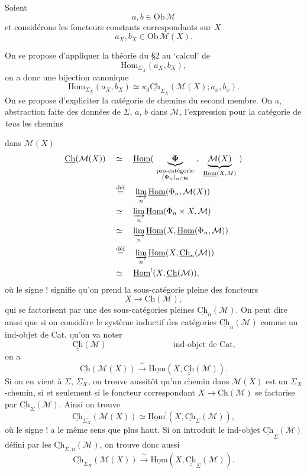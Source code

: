 \documentclass[11pt]{article}
\newcommand{\printedpage}[1]{\marginpar{\footnotesize p.~#1}}
\newcommand{\msp}[1]{\marginpar{\footnotesize [#1]}}
\newcommand{\uHom}{\underline{\mathrm{Hom}}}
\newcommand{\Hom}{\mathrm{Hom}}
\newcommand{\uCh}{\underline{\mathrm{Ch}}}
\newcommand{\Ch}{\underline{\mathrm{Ch}}}
\newcommand{\cM}{\mathcal{M}}
\newcommand{\Chh}{\underline{\underline{\mathrm{Ch}}}}
\newcommand{\dfeq}{\overset{\text{déf}}{=}}
\begin{document}
Soient
\[
a, b \in \mathrm{Ob}\,\mathcal{M}
\]
et considérons les foncteurs constants correspondants sur $X$
\[
a_X, b_X \in \mathrm{Ob}\,\mathcal{M}(X).
\]

\msp{page 29}On se propose d'appliquer la théorie du \S2 au `calcul' de
\[
\Hom_{\Sigma_X}(a_X, b_X),
\]
on a donc une bijection canonique
\[
\boxed{\Hom_{\Sigma_X}(a_X, b_X) \simeq \pi_0\uCh_{\Sigma_X}(\mathcal{M}(X); a_x, b_x).} %
\]
On se propose d'expliciter la catégorie de chemins du second membre. On a, abstraction faite des données de $\Sigma$, $a$, $b$ dans $\mathcal{M}$, l'expression pour la catégorie de \textit{tous} les chemins

\printedpage{19}

dans $\cM(X)$
\[
\begin{aligned}
\Ch(\cM(X)) \quad &\simeq \quad \uHom(\ \underbrace{\boldsymbol{\Phi}}_{\substack{\text{pro-catégorie}\\ (\Phi_n)_{n\in\mathbf{N}}}}\ ,\ \underbrace{\cM(X)}_{\uHom(X,M)}\ ) \\ %
&\dfeq \quad \varinjlim_n \uHom(\Phi_n,\cM(X)) \\
&\simeq \quad \varinjlim_n \uHom(\Phi_n\times X,\cM) \\
&\simeq \quad \varinjlim_n \uHom(X,\uHom(\Phi_n,\cM)) \\
&\dfeq \quad \varinjlim_n \uHom(X,\Ch_n(\cM)) \\
&\simeq \quad \uHom^{!}(X,\Ch(\cM)),
\end{aligned}
\]
où le signe ! signifie qu'on prend la sous-catégorie pleine des foncteurs
\[
X\longrightarrow \Ch(\cM),
\]
\msp{page 30}
qui se factorisent par une des sous-catégories pleines $\Ch_n(\cM)$. On peut dire aussi que si on considère le système inductif des catégories $\Ch_n(\cM)$ comme un ind-objet de Cat, qu'on va noter
\[
\Chh(\cM) \qquad\qquad\qquad\qquad \text{ind-objet de Cat,}
\]
on a
\[
\Ch(\cM(X)) \xrightarrow{\ \sim\ } \uHom(X,\Chh(\cM)).
\]
Si on en vient à $\Sigma$, $\Sigma_X$, on trouve aussitôt qu'un chemin dans $\cM(X)$ est un $\Sigma_X$-chemin, si et seulement si le foncteur correspondant $X\longrightarrow\Ch(\cM)$ se factorise par $\Ch_{\Sigma}(\cM)$. Ainsi on trouve
\[
\Ch_{\Sigma_X}(\cM(X))\simeq\uHom^{!}(X,\Ch_{\Sigma}(\cM)),
\]
où le signe ! a le même sens que plus haut. Si on introduit le ind-objet $\Chh_{\Sigma}(\cM)$ défini par les $\Ch_{\Sigma,n}(\cM)$, on trouve donc aussi
\[
\Ch_{\Sigma_X}(\cM(X))\xrightarrow{\ \sim\ }\uHom(X,\Chh_{\Sigma}(\cM)).
\]
\end{document}
